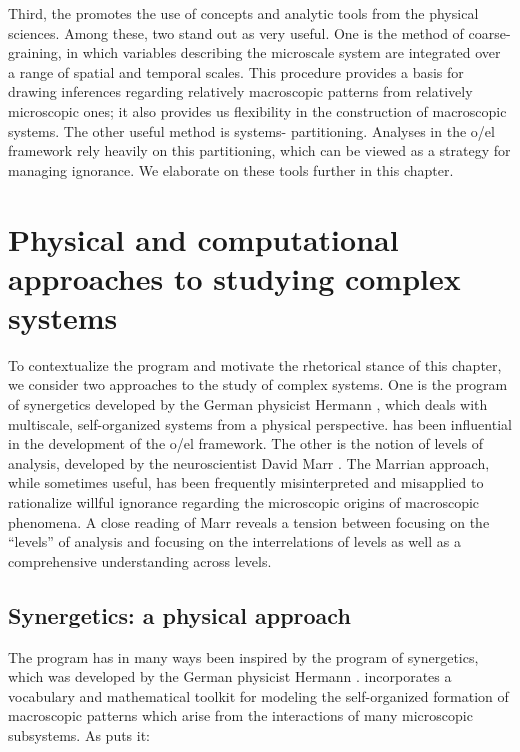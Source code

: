   Third, the  promotes the use of concepts and analytic tools from the physical sciences. Among these, two stand out as very useful. One is the method of coarse-graining, in which variables describing the microscale system are integrated over a range of spatial and temporal scales. This procedure provides a basis for drawing inferences regarding relatively macroscopic patterns from relatively microscopic ones; it also provides us flexibility in the construction of macroscopic systems. The other useful method is systems- partitioning. Analyses in the o/el framework rely heavily on this partitioning, which can be viewed as a strategy for managing ignorance. We elaborate on these tools further in this chapter.

\section{Physical and computational approaches to studying complex systems}

To contextualize the  program and motivate the rhetorical stance of this chapter, we consider two approaches to the study of complex systems. One is the program of synergetics developed by the German physicist Hermann  \citep{Haken1973,Haken1983b,Haken1983a}, which deals with multiscale, self-organized systems from a physical perspective.  has been influential in the development of the o/el framework. The other is the notion of levels of analysis, developed by the neuroscientist David Marr \citep{MarrPoggio1977,Marr1982}. The Marrian approach, while sometimes useful, has been frequently misinterpreted and misapplied to rationalize willful ignorance regarding the microscopic origins of macroscopic phenomena. A close reading of Marr reveals a tension between focusing on the “levels” of analysis and focusing on the interrelations of levels as well as a comprehensive understanding across levels.

\subsection{Synergetics: a physical approach}

The  program has in many ways been inspired by the program of synergetics, which was developed by the German physicist Hermann  \citep{Haken1973,Haken1983b,Haken1983a}.  incorporates a vocabulary and mathematical toolkit for modeling the self-organized formation of macroscopic patterns which arise from the interactions of many microscopic subsystems. As \citet{Haken1973} puts it:

